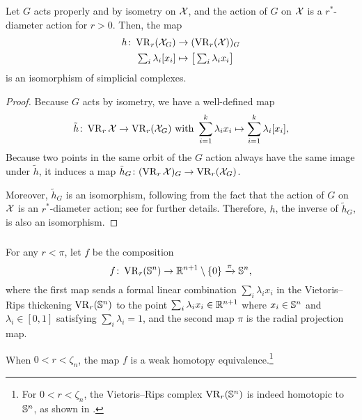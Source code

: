 \medskip\lemma
Let $G$ acts properly and by isometry on $\mathcal{X}$, and the action of $G$ on $\mathcal{X}$ is a $r^*$-diameter action for $r>0$.
Then, the map
\begin{align*}
	h \colon \operatorname{VR}_r(\mathcal{X}_G) &\to (\operatorname{VR}_r(\mathcal{X}))_G \\
	\textstyle\sum_i\lambda_i [x_i] &\mapsto \textstyle \big[\sum_i\lambda_i x_i\big]
\end{align*}
is an isomorphism of simplicial complexes.

\begin{proof}
	Because $G$ acts by isometry, we have a well-defined map
	\[
	\tilde{h} \colon \operatorname{VR}_r\mathcal{X} \to \operatorname{VR}_r(\mathcal{X}_G)
	\text{ with }
	\sum_{i=1}^k \lambda_i x_i \mapsto \sum_{i=1}^k \lambda_i [x_i],
	\]
	Because two points in the same orbit of the $G$ action always have the same image under $\tilde{h}$, it induces a map $\tilde{h}_G \colon (\operatorname{VR}_r\mathcal{X})_G \to \operatorname{VR}_r(\mathcal{X}_G)$.

	Moreover, $\tilde{h}_G$ is an isomorphism, following from the fact that the action of $G$ on $\mathcal{X}$ is an $r^*$-diameter action; see \cite[Proposition 3.5]{adams2022metric} for further details.
	Therefore, $h$, the inverse of $\tilde{h}_G$, is also an isomorphism.
\end{proof}

\subsubsection{}\label{subsub:f}

For any $r<\pi$, let $f$ be the composition
\[
f \colon \operatorname{VR}_r(\mathbb{S}^n) \to \mathbb{R}^{n+1} \setminus \{0\} \xrightarrow{\pi} \mathbb{S}^n,
\]
where the first map sends a formal linear combination $\sum_i\lambda_i x_i$ in the Vietoris--Rips thickening $\operatorname{VR}_r(\mathbb{S}^n)$ to the point $\sum_i\lambda_i x_i \in \mathbb{R}^{n+1}$ where $x_i \in \mathbb{S}^n$ and $\lambda_i \in [0,1]$ satisfying $\sum_i\lambda_i = 1$, and the second map $\pi$ is the radial projection map.

\medskip\lemma
When $0 < r < \zeta_n$, the map $f$ is a weak homotopy equivalence.\footnote{For $0 < r < \zeta_n$, the Vietoris--Rips complex $\operatorname{VR}_r(\mathbb{S}^n)$ is indeed homotopic to $\mathbb{S}^n$, as shown in \cite[Theorem 7.1]{lim2020vietoris}.}

